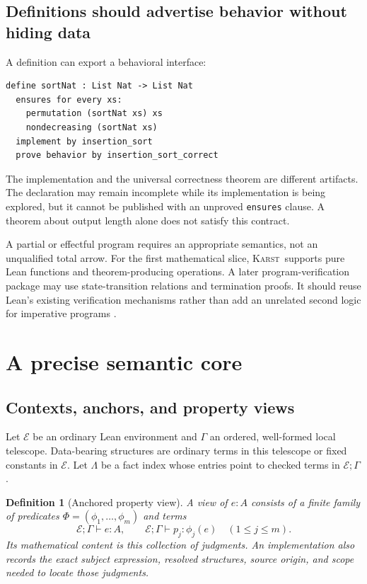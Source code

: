 \documentclass[11pt,letterpaper]{article}
\newcommand{\code}[1]{\nolinkurl{#1}}
\newcommand{\Karst}{\textsc{Karst}}
\newtheorem{definition}{Definition}[section]
\theoremstyle{remark}
\begin{document}
\subsection{Definitions should advertise behavior without hiding data}
A definition can export a behavioral interface:
\begin{lstlisting}[caption={A function contract is part of the requested result.}]
define sortNat : List Nat -> List Nat
  ensures for every xs:
    permutation (sortNat xs) xs
    nondecreasing (sortNat xs)
  implement by insertion_sort
  prove behavior by insertion_sort_correct
\end{lstlisting}

The implementation and the universal correctness theorem are different
artifacts. The declaration may remain incomplete while its implementation is
being explored, but it cannot be published with an unproved \code{ensures}
clause. A theorem about output length alone does not satisfy this contract.

A partial or effectful program requires an appropriate semantics, not an
unqualified total arrow. For the first mathematical slice, \Karst\ supports
pure Lean functions and theorem-producing operations. A later program-verification
package may use state-transition relations and termination proofs. It should
reuse Lean's existing verification mechanisms rather than add an unrelated
second logic for imperative programs \cite{leanrecursive,leantactics}.

\section{A precise semantic core}\label{sec:semantics}

\subsection{Contexts, anchors, and property views}
Let $\mathcal E$ be an ordinary Lean environment and $\Gamma$ an ordered,
well-formed local telescope. Data-bearing structures are ordinary terms in
this telescope or fixed constants in $\mathcal E$. Let $\Lambda$ be a fact
index whose entries point to checked terms in $\mathcal E;\Gamma$.

\begin{definition}[Anchored property view]
A view of $e:A$ consists of a finite family of predicates
$\Phi=(\phi_1,\ldots,\phi_m)$ and terms
\[
 \mathcal E;\Gamma\vdash e:A,
 \qquad \mathcal E;\Gamma\vdash p_j:\phi_j(e)\quad(1\le j\le m).
\]
Its mathematical content is this collection of judgments. An implementation
also records the exact subject expression, resolved structures, source origin,
and scope needed to locate those judgments.
\end{definition}
\end{document}
